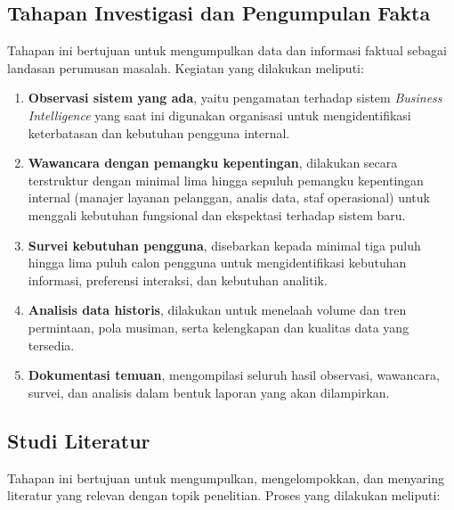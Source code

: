\subsection{Tahapan Investigasi dan Pengumpulan Fakta}

Tahapan ini bertujuan untuk mengumpulkan data dan informasi faktual sebagai landasan perumusan masalah. Kegiatan yang dilakukan meliputi:

\begin{enumerate}[label=\alph*.]
  \item \textbf{Observasi sistem yang ada}, yaitu pengamatan terhadap sistem \textit{Business Intelligence} yang saat ini digunakan organisasi untuk mengidentifikasi keterbatasan dan kebutuhan pengguna internal.
  
  \item \textbf{Wawancara dengan pemangku kepentingan}, dilakukan secara terstruktur dengan minimal lima hingga sepuluh pemangku kepentingan internal (manajer layanan pelanggan, analis data, staf operasional) untuk menggali kebutuhan fungsional dan ekspektasi terhadap sistem baru.
  
  \item \textbf{Survei kebutuhan pengguna}, disebarkan kepada minimal tiga puluh hingga lima puluh calon pengguna untuk mengidentifikasi kebutuhan informasi, preferensi interaksi, dan kebutuhan analitik.
  
  \item \textbf{Analisis data historis}, dilakukan untuk menelaah volume dan tren permintaan, pola musiman, serta kelengkapan dan kualitas data yang tersedia.
  
  \item \textbf{Dokumentasi temuan}, mengompilasi seluruh hasil observasi, wawancara, survei, dan analisis dalam bentuk laporan yang akan dilampirkan.
\end{enumerate}

\subsection{Studi Literatur}

Tahapan ini bertujuan untuk mengumpulkan, mengelompokkan, dan menyaring literatur yang relevan dengan topik penelitian. Proses yang dilakukan meliputi:

